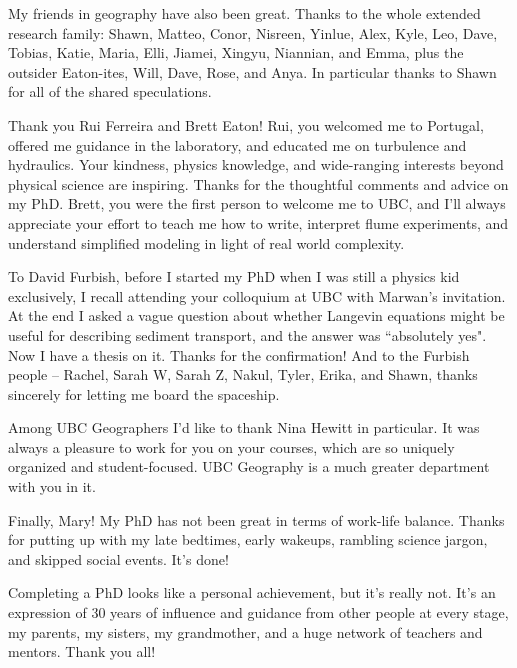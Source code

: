 My friends in geography have also been great. Thanks to the whole extended research family: Shawn, Matteo, Conor, Nisreen, Yinlue, Alex, Kyle, Leo, Dave, Tobias, Katie, Maria, Elli, Jiamei, Xingyu, Niannian, and Emma, plus the outsider Eaton-ites, Will, Dave, Rose, and Anya. In particular thanks to Shawn for all of the shared speculations.

Thank you Rui Ferreira and Brett Eaton!
Rui, you welcomed me to Portugal, offered me guidance in the laboratory, and educated me on turbulence and hydraulics. Your kindness, physics knowledge, and wide-ranging interests beyond physical science are inspiring. Thanks for the thoughtful comments and advice on my PhD.
Brett, you were the first person to welcome me to UBC, and I'll always appreciate your effort to teach me how to write, interpret flume experiments, and understand simplified modeling in light of real world complexity. 

To David Furbish, before I started my PhD when I was still a physics kid exclusively, I recall attending your colloquium at UBC with Marwan's invitation. At the end I asked a vague question about whether Langevin equations might be useful for describing sediment transport, and the answer was ``absolutely yes". Now I have a thesis on it. Thanks for the confirmation! And to the Furbish people -- Rachel, Sarah W, Sarah Z, Nakul, Tyler, Erika, and Shawn, thanks sincerely for letting me board the spaceship.

Among UBC Geographers I'd like to thank Nina Hewitt in particular. It was always a pleasure to work for you on your courses, which are so uniquely organized and student-focused. UBC Geography is a much greater department with you in it.

Finally, Mary! My PhD has not been great in terms of work-life balance. Thanks for putting up with my late bedtimes, early wakeups, rambling science jargon, and skipped social events. It's done!

Completing a PhD looks like a personal achievement, but it's really not.
It's an expression of 30 years of influence and guidance from other people at every stage, my parents, my sisters, my grandmother, and a huge network of teachers and mentors. Thank you all!


\endinput

Mom, during my childhood, you worked full time, taught piano lessons, earned Master and Doctoral degrees, played organ every Sunday, consoled us through every difficulty, and engaged us in as many extracurricular activities as we were willing to take on.
I cannot imagine a better role model of work ethic, open-mindedness, and devotion. I hope I picked a few things up!

